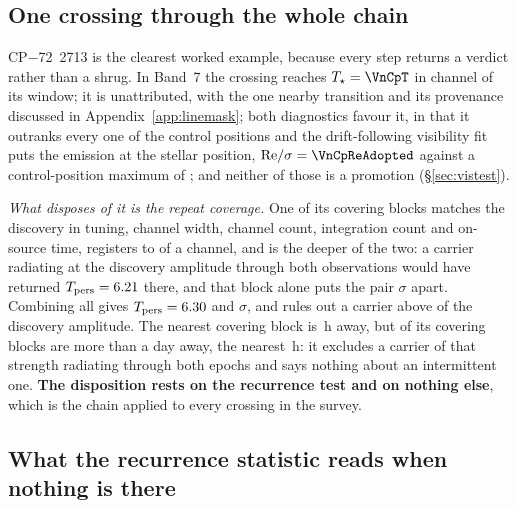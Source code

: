 \subsection{One crossing through the whole chain}

CP$-$72~2713 is the clearest worked example, because every step returns a
verdict rather than a shrug. In Band~7 the crossing reaches
$T_\star=\VnCpT$ in channel \VnCpChan{} of its window; it is unattributed,
with the one nearby transition and its provenance discussed in
Appendix~\ref{app:linemask}; both diagnostics favour it, in that it outranks
every one of the \NCtrl{} control positions and the drift-following
visibility fit puts the emission at the stellar position, ${\rm
Re}/\sigma=\VnCpReAdopted$ against a control-position maximum of
\VnCpCtrlAdopted; and neither of those is a promotion
(\S\ref{sec:vistest}).

\emph{What disposes of it is the repeat coverage.} One of its
\XcCpNRep{} covering blocks matches the discovery in tuning, channel width,
channel count, integration count and on-source time, registers to
\CpRecOffChan{} of a channel, and is the deeper of the two: a carrier
radiating at the discovery amplitude through both observations would have
returned $T_{\rm pers}=6.21$ there, and that block alone puts the
pair \XcCpExclOne$\sigma$ apart. Combining all \XcCpNRep{} gives
$T_{\rm pers}=6.30$ and \XcCpExcl$\sigma$, and rules out a carrier
above \XcCpFrac{} of the discovery amplitude. The nearest covering block is
\XcCpSepH\,h away, but \ZdCpNAway{} of its \ZdCpNRep{} covering blocks are
more than a day away, the nearest \ZdCpNearH\,h: it excludes a
carrier of that strength radiating through both epochs and says nothing about
an intermittent one. \textbf{The disposition rests on the recurrence test and
on nothing else}, which is the chain applied to every crossing in the survey.

\subsection{What the recurrence statistic reads when nothing is there}

